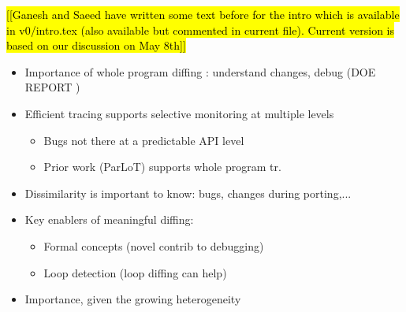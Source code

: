 
\hl{[[Ganesh and Saeed have written some text before for the intro which is available in v0/intro.tex (also available but commented in current file). Current version is based on our discussion on May 8th]]}

\begin{itemize}
	\item Importance of whole program diffing : understand changes, debug (DOE REPORT \cite{hpcdoe})
	\item Efficient tracing supports selective monitoring at multiple levels
	\begin{itemize}
		\item Bugs not there at a predictable API level
		\item Prior work (ParLoT) supports whole program tr.
	\end{itemize}
	\item Dissimilarity is important to know: bugs, changes during porting,...
	\item Key enablers of meaningful diffing:
	\begin{itemize}
		\item Formal concepts (novel contrib to debugging)
		\item Loop detection (loop diffing can help)
	\end{itemize}
	\item Importance, given the growing heterogeneity
\end{itemize}


%
%
%
%
%
%



